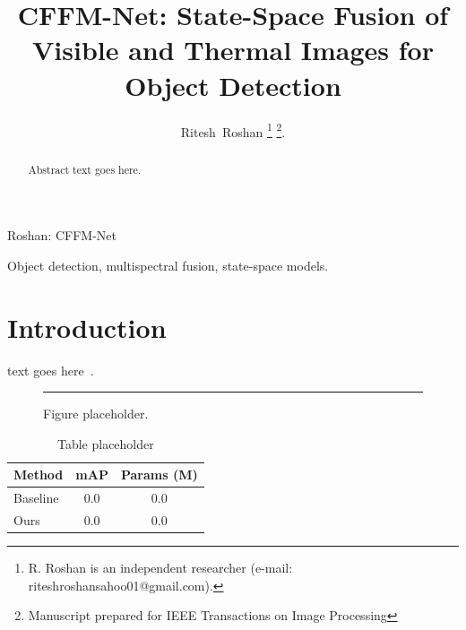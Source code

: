 \documentclass[journal]{IEEEtran}
\begin{document}
\title{CFFM-Net: State-Space Fusion of Visible and Thermal Images for Object Detection}

\author{Ritesh~Roshan%
\thanks{R. Roshan is an independent researcher (e-mail: riteshroshansahoo01@gmail.com).}%
\thanks{Manuscript prepared for IEEE Transactions on Image Processing}.}

%
{Roshan: CFFM-Net}

\maketitle

\begin{abstract}
Abstract text goes here.
\end{abstract}

\begin{IEEEkeywords}
Object detection, multispectral fusion, state-space models.
\end{IEEEkeywords}

\section{Introduction}
\label{sec:intro}
 text goes here~\cite{gu2023mamba}.

\begin{figure}[t]
  \centering
  \rule{0.9\linewidth}{4cm}
  \caption{Figure placeholder.}
  \label{fig:placeholder}
\end{figure}

\begin{table}[t]
  \caption{Table placeholder}
  \label{tab:placeholder}
  \centering
  \begin{tabular}{lcc}
    \toprule
    Method & mAP & Params (M) \\
    \midrule
    Baseline & 0.0 & 0.0 \\
    Ours & 0.0 & 0.0 \\
    \bottomrule
  \end{tabular}
\end{table}



\end{document}
